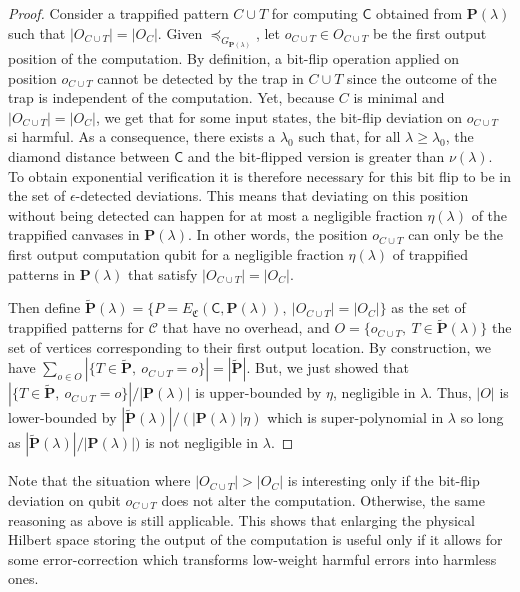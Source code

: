 \documentclass[12pt]{iopart}
\newcommand{\cptp}[1]{\mathsf{#1}} \newcommand{\pd}[1]{\mathcal{#1}}  \newcommand{\sch}[1]{\bm{#1}}
\renewcommand{\1}{\mathds{1}}
\newcommand{\TP}{C\cup T}
\begin{document}
\begin{proof}
Consider a trappified pattern $\TP$ for computing $\cptp C$ obtained from $\sch P(\lambda)$ such that $|O_{\TP}| = |O_{C}|$.
Given $\preceq_{G_{\sch P(\lambda)}}$, let $o_{\TP} \in O_{\TP}$ be the first output position of the computation.
By definition, a bit-flip operation applied on position $o_{\TP}$ cannot be detected by the trap in $\TP$ since the outcome of the trap is independent of the computation.
Yet, because $C$ is minimal and $|O_{\TP}| = |O_{C}|$, we get that for some input states, the bit-flip deviation on $o_{\TP}$ si harmful.
As a consequence, there exists a $\lambda_0$ such that, for all $\lambda \geq \lambda_0$, the diamond distance between $\cptp C$ and the bit-flipped version is greater than $\nu(\lambda)$.
To obtain exponential verification it is therefore necessary for this bit flip to be in the set of $\epsilon$-detected deviations.
This means that deviating on this position without being detected can happen for at most a negligible fraction $\eta(\lambda)$ of the trappified canvases in $\sch P(\lambda)$.
In other words, the position $o_{\TP}$ can only be the first output computation qubit for a negligible fraction $\eta(\lambda)$ of trappified patterns in $\sch P(\lambda)$ that satisfy $|O_{\TP}| = |O_{C}|$.

Then define $\tilde {\sch P}(\lambda) = \{P = E_{\mathfrak C}(\cptp C,\sch P(\lambda)), \ |O_{\TP}| = |O_{C}|\}$ as the set of trappified patterns for $\mathcal C$ that have no overhead,
and $O = \{o_{\TP}, \ T \in \tilde{\sch P}(\lambda)\}$ the set of vertices corresponding to their first output location.
By construction, we have $\sum_{o \in O} |\{T \in \tilde{\sch P}, \ o_{\TP} = o\}| = |\tilde{\sch P}|$.
But, we just showed that $|\{T \in \tilde{\sch P}, \ o_{\TP} = o\}|/|\sch P(\lambda)|$ is upper-bounded by $\eta$, negligible in $\lambda$.
Thus, $|O|$ is lower-bounded by $|\tilde{\sch P}(\lambda)|/ (|\sch P(\lambda)|\eta)$ which is super-polynomial in $\lambda$ so long as $|\tilde{\sch P}(\lambda)|/|\sch P(\lambda)|)$ is not negligible in $\lambda$.
\end{proof}

Note that the situation where $|O_{\TP}| > |O_{C}|$ is interesting only if the bit-flip deviation on qubit $o_{\TP}$ does not alter the computation.
Otherwise, the same reasoning as above is still applicable.
This shows that enlarging the physical Hilbert space storing the output of the computation is useful only if it allows for some error-correction which transforms low-weight harmful errors into harmless ones.
  
\end{document}
